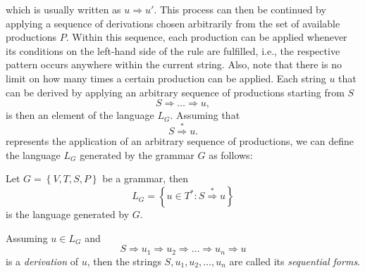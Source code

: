 which is usually written as $u \Rightarrow u'$.
This process can then be continued by applying a sequence of derivations chosen arbitrarily from the set of available productions $P$.
Within this sequence, each production can be applied whenever its conditions on the left-hand side of the rule are fulfilled, i.e., the respective pattern occurs anywhere within the current string.
Also, note that there is no limit on how many times a certain production can be applied.
Each string $u$ that can be derived by applying an arbitrary sequence of productions starting from $S$
\begin{equation}
	S \Rightarrow \dots \Rightarrow u,
\end{equation}
is then an element of the language $L_G$.
Assuming that 
\begin{equation}
	S \overset{*}{\Rightarrow} u.
\end{equation}
represents the application of an arbitrary sequence of productions, we can define the language $L_G$ generated by the grammar $G$ as follows:
\begin{definition}[Language]\label{def:language}
	Let $G = \left\{V, T, S, P\right\}$ be a grammar, then
	\begin{equation}
		L_G = \left\{u \in T^* : S \overset{*}{\Rightarrow} u\right\}
	\end{equation}
is the language generated by $G$.
\end{definition}
Assuming $u \in L_G$ and 
\begin{equation}
	S \Rightarrow u_1 \Rightarrow u_2 \Rightarrow \dots \Rightarrow u_n \Rightarrow u
\end{equation}
is a \emph{derivation} of $u$, then the strings $S, u_1, u_2, \dots, u_n$ are called its \emph{sequential forms}.
